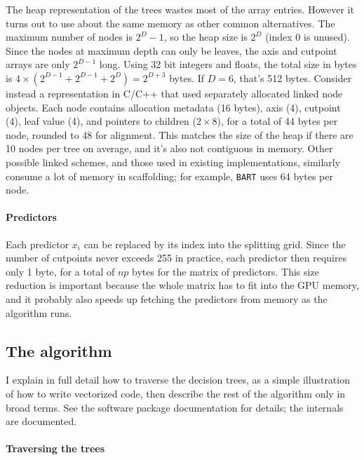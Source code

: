 \documentclass{article}
\begin{document}
    The heap representation of the trees wastes most of the array entries. However it turns out to use about the same memory as other common alternatives. The maximum number of nodes is $2^D - 1$, so the heap size is $2^D$ (index 0 is unused). Since the nodes at maximum depth can only be leaves, the axis and cutpoint arrays are only $2^{D-1}$ long. Using 32 bit integers and floats, the total size in bytes is $4 \times (2^{D-1} + 2^{D-1} + 2^{D}) = 2^{D+3}$ bytes. If $D=6$, that's 512 bytes. Consider instead a representation in C/C++ that used separately allocated linked node objects. Each node contains allocation metadata (16 bytes), axis (4), cutpoint (4), leaf value (4), and pointers to children ($2\times 8$), for a total of 44 bytes per node, rounded to 48 for alignment. This matches the size of the heap if there are 10 nodes per tree on average, and it's also not contiguous in memory. Other possible linked schemes, and those used in existing implementations, similarly consume a lot of memory in scaffolding; for example, \texttt{BART} uses 64 bytes per node. %

    \paragraph{Predictors}

    Each predictor $x_i$ can be replaced by its index into the splitting grid. Since the number of cutpoints never exceeds 255 in practice, each predictor then requires only 1 byte, for a total of $np$ bytes for the matrix of predictors. This size reduction is important because the whole matrix has to fit into the GPU memory, and it probably also speeds up fetching the predictors from memory as the algorithm runs.

    \subsection{The algorithm}

    I explain in full detail how to traverse the decision trees, as a simple illustration of how to write vectorized code, then describe the rest of the algorithm only in broad terms. See the software package documentation for details; the internals are documented.

    \paragraph{Traversing the trees}
\end{document}
